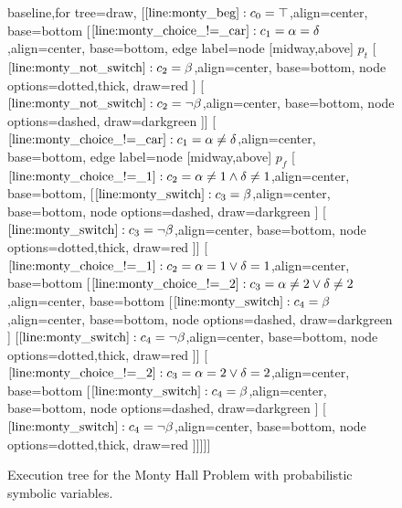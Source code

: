 \documentclass[acmsmall,review,anonymous]{acmart}\settopmatter{printfolios=true,printccs=false,printacmref=false}
\begin{document}
\begin{figure}
	\centering
	{\footnotesize
		\begin{forest}baseline,for tree=draw,
			[{$\mathtt{\ref{line:monty_beg}}: c_0=\top$},align=center, base=bottom
			[{$\mathtt{\ref{line:monty_choice_!=_car}}: c_1 = \alpha = \delta$},align=center, base=bottom, edge label={node [midway,above] {$p_t$} }
      [{$\mathtt{\ref{line:monty_not_switch}}: c_2 = \beta$},align=center, base=bottom, node options={dotted,thick}, draw=red ] %
      [{$\mathtt{\ref{line:monty_not_switch}}: c_2 =  \neg\beta$},align=center, base=bottom, node options={dashed}, draw=darkgreen ]] %
			[{$\mathtt{\ref{line:monty_choice_!=_car}}: c_1 = \alpha \neq \delta$},align=center, base=bottom, edge label={node [midway,above] {$p_f$} }
			[{$\mathtt{\ref{line:monty_choice_!=_1}}: c_2 = \alpha \neq 1 \wedge \delta \neq 1$},align=center, base=bottom,
			[{$\mathtt{\ref{line:monty_switch}}: c_3 = \beta$},align=center, base=bottom, node options={dashed}, draw=darkgreen ] %
      [{$\mathtt{\ref{line:monty_switch}}: c_3 = \neg\beta$},align=center, base=bottom, node options={dotted,thick}, draw=red ]] %
			[{$\mathtt{\ref{line:monty_choice_!=_1}}: c_2 = \alpha = 1 \vee \delta = 1$},align=center, base=bottom
			[{$\mathtt{\ref{line:monty_choice_!=_2}}: c_3 = \alpha \neq 2 \vee \delta \neq 2$},align=center, base=bottom
			[{$\mathtt{\ref{line:monty_switch}}: c_4 = \beta$},align=center, base=bottom, node options={dashed}, draw=darkgreen ] %
			[{$\mathtt{\ref{line:monty_switch}}: c_4 = \neg\beta$},align=center, base=bottom, node options={dotted,thick}, draw=red ]] %
			[{$\mathtt{\ref{line:monty_choice_!=_2}}: c_3 = \alpha = 2 \vee \delta = 2$},align=center, base=bottom
			[{$\mathtt{\ref{line:monty_switch}}: c_4 = \beta$},align=center, base=bottom, node options={dashed}, draw=darkgreen ]%
			[{$\mathtt{\ref{line:monty_switch}}: c_4 = \neg\beta$},align=center, base=bottom, node options={dotted,thick}, draw=red ]]]]] %
		\end{forest}
	}
	\caption{Execution tree for the Monty Hall Problem with probabilistic symbolic variables.}
	\label{fig:montyhall_tree_prob}
\end{figure}
\end{document}
